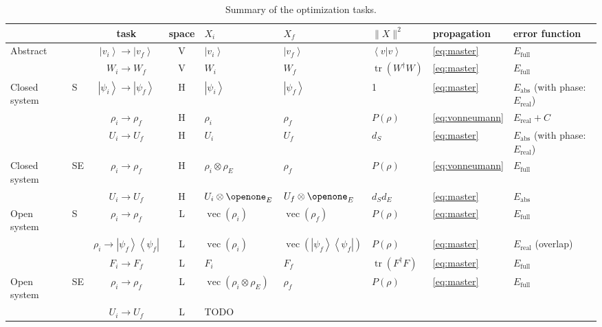 \documentclass[aps, pra, a4paper, longbibliography, superscriptaddress]{revtex4-1}
\newcommand{\I}{\openone}
\newcommand{\ket}[1]{\left| #1 \right \rangle}
\newcommand{\braket}[2]{\left \langle #1 | #2 \right \rangle}
\newcommand{\ketbra}[2]{\left| #1 \right \rangle \left \langle #2 \right|}
\DeclareMathOperator{\tr}{tr}
\DeclareMathOperator{\cvec}{vec}
\begin{document}
\begin{table}
\begin{tabular}{ll|c|c|l|l|l|l|l}
& & task & space & $X_i$ & $X_f$ & $\|X\|^2$ & propagation & error function\\
\hline
Abstract &
& $\ket{v_i} \to \ket{v_f}$ & V
& $\ket{v_i}$ &$\ket{v_f}$ & $\braket{v}{v}$ &
\eqref{eq:master} & $E_\text{full}$\\
& & $W_i \to W_f$ & V
& $W_i$ & $W_f$ & $\tr(W^\dagger W)$ &
\eqref{eq:master} & $E_\text{full}$\\
\hline
Closed system & S
& $\ket{\psi_i} \to \ket{\psi_f}$ & H
& $\ket{\psi_i}$ & $\ket{\psi_f}$ & 1 &
\eqref{eq:master} & $E_\text{abs}$ (with phase: $E_\text{real}$)\\
& & $\rho_i \to \rho_f$ & H
& $\rho_i$ & $\rho_f$ & $P(\rho)$ &
\eqref{eq:vonneumann} & $E_\text{real} + C$\\
& & $U_i \to U_f$ & H
& $U_i$ & $U_f$ & $d_S$ &
\eqref{eq:master} & $E_\text{abs}$ (with phase: $E_\text{real}$)\\
\hline
Closed system & SE
& $\rho_i \to \rho_f$ & H
& $\rho_i \otimes \rho_E$ & $\rho_f$ & $P(\rho)$ &
\eqref{eq:vonneumann} & $E_\text{full}$\\
& & $U_i \to U_f$ & H
& $U_i \otimes \I_E$ & $U_f \otimes \I_E$ & $d_S d_E$ &
\eqref{eq:master} & $E_\text{abs}$\\
\hline
Open system & S
& $\rho_i \to \rho_f$ & L & $\cvec(\rho_i)$ & $\cvec(\rho_f)$ & $P(\rho)$ &
\eqref{eq:master} & $E_\text{full}$\\
& & $\rho_i \to \ketbra{\psi_f}{\psi_f}$ & L
& $\cvec(\rho_i)$ & $\cvec(\ketbra{\psi_f}{\psi_f})$ & $P(\rho)$ &
\eqref{eq:master} & $E_\text{real}$ (overlap)\\
& & $F_i \to F_f$ & L & $F_i$ & $F_f$ & $\tr(F^\dagger F)$ &
\eqref{eq:master} & $E_\text{full}$\\
\hline
Open system & SE
& $\rho_i \to \rho_f$ & L
& $\cvec(\rho_i \otimes \rho_E)$ & $\rho_f$ & $P(\rho)$ &
\eqref{eq:master} & $E_\text{full}$\\
& & $U_i \to U_f$ & L & TODO
\end{tabular}
\caption{Summary of the optimization tasks.
\label{table:tasks}
}
\end{table}
\end{document}
